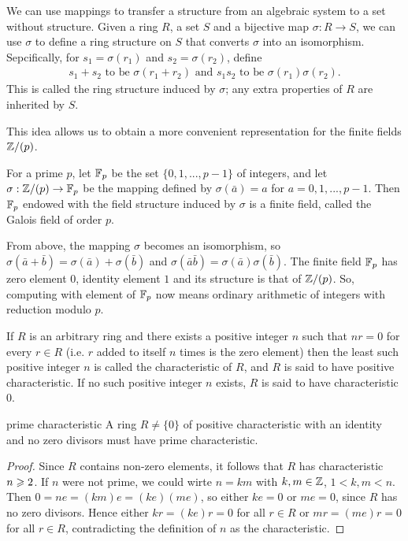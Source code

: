 We can use mappings to transfer a structure from an algebraic system to a set without structure.
Given a ring $R$, a set $S$ and a bijective map $\sigma:R\rightarrow S$,
we can use $\sigma$ to define a ring structure on $S$ that
converts $\sigma$ into an isomorphism. Sepcifically, for $s_1=\sigma(r_1)$ and $s_2=\sigma(r_2)$, define
\begin{align*}
    s_1+s_2 \text{ to be } \sigma(r_1+r_2) \text{ and } s_1s_2 \text{ to be } \sigma(r_1)\sigma(r_2).
\end{align*}
This is called the ring structure induced by $\sigma$; any extra properties of $R$ are inherited by $S$.
\par
This idea allows us to obtain a more convenient representation for the finite fields $\mathbb{Z}/(p)$.

\begin{definition}{}{}
    For a prime $p$, let $\mathbb{F}_p$ be the set $\{0,1,...,p-1\}$ of integers,
    and let $\sigma: \mathbb{Z}/(p)\rightarrow \mathbb{F}_p$ be the mapping defined by $\sigma(\bar{a})=a$ for $a=0,1,...,p-1$.
    Then $\mathbb{F}_p$ endowed with the field structure induced by $\sigma$ is a finite field, called the Galois field of order $p$.
\end{definition}

From above, the mapping $\sigma$ becomes an isomorphism, 
so $\sigma (\bar{a}+\bar{b})=\sigma (\bar{a}) + \sigma (\bar{b})$ and $\sigma(\bar{a}\bar{b})=\sigma(\bar{a})\sigma(\bar{b})$.
The finite field $\mathbb{F}_p$ has zero element $0$, identity element $1$ and its structure is that of $\mathbb{Z}/(p)$.
So, computing with element of $\mathbb{F}_p$ now means ordinary arithmetic of integers with reduction modulo $p$.

\begin{definition}{}{}
    If $R$ is an arbitrary ring and there exists a positive integer $n$ such that $nr=0$ for every $r\in R$
    (i.e. $r$ added to itself $n$ times is the zero element) then the least such positive integer $n$ is called
    the characteristic of $R$, and $R$ is said to have positive characteristic.
    If no such positive integer $n$ exists, $R$ is said to have characteristic $0$.
\end{definition}

\begin{proposition}{}{prime characteristic}
    A ring $R\neq \{0\}$ of positive characteristic with an identity and no zero divisors must have prime characteristic.
\end{proposition}
\begin{proof}
    Since $R$ contains non-zero elements, 
    it follows that $R$ has characteristic $n\geqslant 2$.
    If $n$ were not prime, we could wirte $n=km$ with $k,m\in\mathbb{Z}$, $1<k,m<n$.
    Then $0=ne=(km)e=(ke)(me)$, so either $ke=0$ or $me=0$, since $R$ has no zero divisors.
    Hence either $kr=(ke)r=0$ for all $r\in R$ or $mr=(me)r=0$ for all $r\in R$, contradicting the definition of $n$ as the characteristic.
\end{proof}

